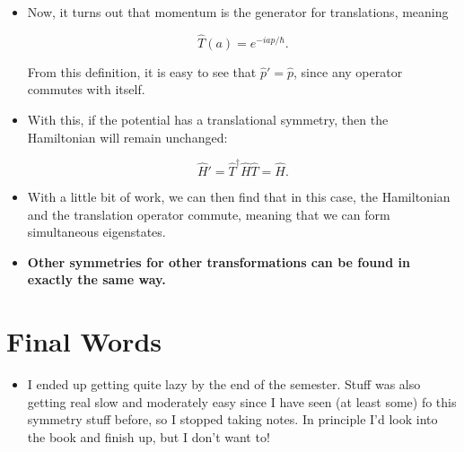 \begin{itemize}
  
\item Now, it turns out that momentum is the generator for translations, meaning

  \begin{equation}
    \hat{T}(a) = e^{-ia\hat{p}/\hbar}.
  \end{equation}

  From this definition, it is easy to see that $\hat{p}' = \hat{p}$, since any operator commutes with itself.

\item With this, if the potential has a translational symmetry, then the Hamiltonian will remain unchanged:

  \begin{equation}
    \hat{H}' = \hat{T}^\dagger\hat{H}\hat{T} = \hat{H}.
  \end{equation}

\item With a little bit of work, we can then find that in this case, the Hamiltonian and the translation operator commute, meaning that we can form simultaneous eigenstates.

\item \textbf{Other symmetries for other transformations can be found in exactly the same way.}
  
\end{itemize}






\section{Final Words}

\begin{itemize}
\item I ended up getting quite lazy by the end of the semester. Stuff was also getting real slow and moderately easy since I have seen (at least some) fo this symmetry stuff before, so I stopped taking notes. In principle I'd look into the book and finish up, but I don't want to!
\end{itemize}




